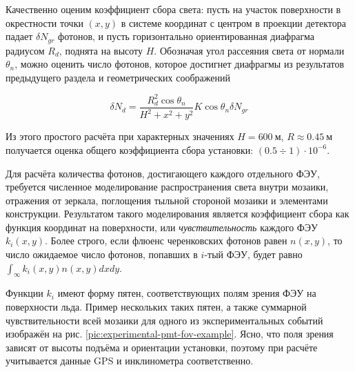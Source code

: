 \documentclass[12pt]{book}
\begin{document}
	Качественно оценим коэффициент сбора света: пусть на участок поверхности в окрестности точки $(x, y)$ в системе координат с центром в проекции детектора падает $\delta N_{gr}$ фотонов, и пусть горизонтально ориентированная диафрагма радиусом $R_{d}$, поднята на высоту $H$. Обозначая угол рассеяния света от нормали $\theta_n$, можно оценить число фотонов, которое достигнет диафрагмы из результатов предыдущего раздела и геометрических соображений
	
	\begin{equation}
		\delta N_{d} = \frac{R_d^2 \cos \theta_n}{H^2 + x^2 + y^2} K \cos \theta_n \delta N_{gr}
	\end{equation}

	Из этого простого расчёта при характерных значениях $H = 600~\text{м}$, $R \approx 0.45~\text{м}$ получается оценка общего коэффициента сбора установки: $(0.5 \div 1) \cdot 10^{-6}$.

	Для расчёта количества фотонов, достигающего каждого отдельного ФЭУ, требуется численное моделирование распространения света внутри мозаики, отражения от зеркала, поглощения тыльной стороной мозаики и элементами конструкции. Результатом такого моделирования является коэффициент сбора как функция координат на поверхности, или \textit{чувствительность} каждого ФЭУ $k_i(x, y)$. Более строго, если флюенс черенковских фотонов равен $n(x, y)$, то число ожидаемое число фотонов, попавших в $i$-тый ФЭУ, будет равно $\int_{\infty} k_i(x, y) n(x, y) dx dy$.

	Функции $k_i$ имеют форму пятен, соответствующих полям зрения ФЭУ на поверхности льда. Пример нескольких таких пятен, а также суммарной чувствительности всей мозаики для одного из экспериментальных событий изображён на рис. \ref{pic:experimental-pmt-fov-example}. Ясно, что поля зрения зависят от высоты подъёма и ориентации установки, поэтому при расчёте учитывается данные GPS и инклинометра соответственно.
\end{document}
